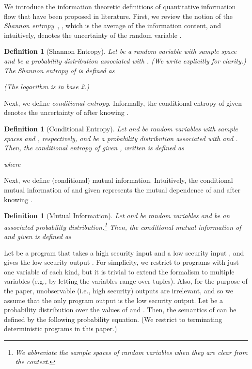 \documentclass{llncs}
\newtheorem{definition}[theorem]{Definition}
\begin{document}
We introduce the information theoretic definitions of quantitative
information flow that have been proposed in literature.  First, we
review the notion of the {\em Shannon entropy}~\cite{shannon48},
, which is the average of the information
content, and intuitively, denotes the uncertainty of the random
variable .
\begin{definition}[Shannon Entropy]
  Let  be a random variable with sample space  and 
  be a probability distribution associated with .  (We write 
  explicitly for clarity.)  The Shannon entropy of  is defined as

(The logarithm is in base 2.)
\end{definition}
Next, we define {\em conditional entropy}.  Informally, the conditional
entropy of  given  denotes the uncertainty of  after knowing
.
\begin{definition}[Conditional Entropy]
Let  and  be random variables with sample spaces  and
, respectively, and  be a probability distribution
associated with  and .  Then, the conditional entropy of 
given , written  is defined as

where

\end{definition}
Next, we define (conditional) mutual information.  Intuitively, the
conditional mutual information of  and  given  represents the
mutual dependence of  and  after knowing .
\begin{definition}[Mutual Information]
  Let  and  be random variables and  be an associated
  probability distribution.\footnote{We abbreviate the sample spaces
    of random variables when they are clear from the context.}  Then,
  the conditional mutual information of  and  given  is
  defined as

\end{definition}

Let  be a program that takes a high security input  and a low
security input , and gives the low security output .  For
simplicity, we restrict to programs with just one variable of each
kind, but it is trivial to extend the formalism to multiple variables
(e.g., by letting the variables range over tuples).  Also, for the
purpose of the paper, unobservable (i.e., high security) outputs are
irrelevant, and so we assume that the only program output is the low
security output.  Let  be a probability distribution over the
values of  and .  Then, the semantics of  can be defined by
the following probability equation. (We restrict to terminating
  deterministic programs in this paper.)
\end{document}
